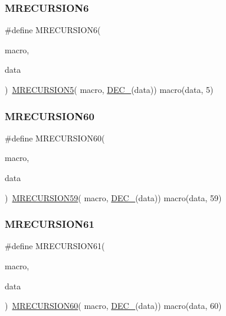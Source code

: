 \subsubsection{\texorpdfstring{MRECURSION6}{MRECURSION6}}
{\footnotesize\ttfamily \#define M\+R\+E\+C\+U\+R\+S\+I\+O\+N6(\begin{DoxyParamCaption}\item[{}]{macro,  }\item[{}]{data }\end{DoxyParamCaption})~\mbox{\hyperlink{group__group__sam0__utils__mrecursion_ga7faede9937334456ce9d5e2b9fbe1663}{M\+R\+E\+C\+U\+R\+S\+I\+O\+N5}}(  macro, \mbox{\hyperlink{group__group__sam0__utils__mrecursion_ga1d23d683797679dca8c3512a54a5dcae}{D\+E\+C\+\_\+}}(data))   macro(data, 5)}

\mbox{\label{group__group__sam0__utils__mrecursion_gae264d2df1687efc33a4381c9dea0f925}} 
\subsubsection{\texorpdfstring{MRECURSION60}{MRECURSION60}}
{\footnotesize\ttfamily \#define M\+R\+E\+C\+U\+R\+S\+I\+O\+N60(\begin{DoxyParamCaption}\item[{}]{macro,  }\item[{}]{data }\end{DoxyParamCaption})~\mbox{\hyperlink{group__group__sam0__utils__mrecursion_gad8878230dd012dbaabd3e2b8a309fafb}{M\+R\+E\+C\+U\+R\+S\+I\+O\+N59}}(  macro, \mbox{\hyperlink{group__group__sam0__utils__mrecursion_ga1d23d683797679dca8c3512a54a5dcae}{D\+E\+C\+\_\+}}(data))   macro(data, 59)}

\mbox{\label{group__group__sam0__utils__mrecursion_ga9ee049c290930ecf8675806b5cdb8266}} 
\subsubsection{\texorpdfstring{MRECURSION61}{MRECURSION61}}
{\footnotesize\ttfamily \#define M\+R\+E\+C\+U\+R\+S\+I\+O\+N61(\begin{DoxyParamCaption}\item[{}]{macro,  }\item[{}]{data }\end{DoxyParamCaption})~\mbox{\hyperlink{group__group__sam0__utils__mrecursion_gae264d2df1687efc33a4381c9dea0f925}{M\+R\+E\+C\+U\+R\+S\+I\+O\+N60}}(  macro, \mbox{\hyperlink{group__group__sam0__utils__mrecursion_ga1d23d683797679dca8c3512a54a5dcae}{D\+E\+C\+\_\+}}(data))   macro(data, 60)}

